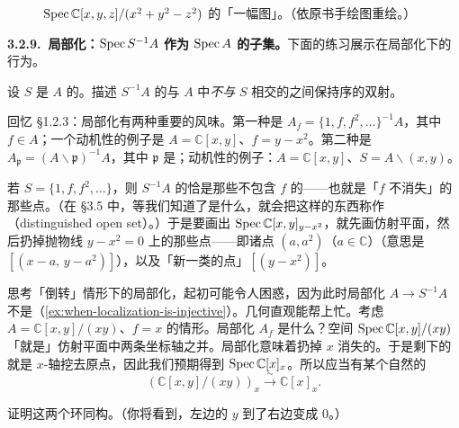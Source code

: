 \begin{figure}[htbp]
\centering
{}
\caption{$\operatorname{Spec}\mathbb{C}[x,y,z]/(x^2+y^2-z^2)$ 的「一幅图」。（依原书手绘图重绘。）}\label{fig:cone-picture}
\end{figure}

\textbf{3.2.9.\ 局部化：$\operatorname{Spec} S^{-1}A$ 作为 $\operatorname{Spec} A$ 的子集。}\quad 下面的练习展示\trPrimeIdeal{}在局部化下的行为。

\begin{exercise}\label{ex:localization-primes-bijection}
设 $S$ 是 $A$ 的\trMultiplicativeSubset。描述 $S^{-1}A$ 的\trPrimeIdeal{}与 $A$ 中\emph{不与}\trMultiplicativeSubset{} $S$ 相交的\trPrimeIdeal{}之间保持序的双射。
\end{exercise}

回忆 \S1.2.3：局部化有两种重要的风味。第一种是 $A_f=\{1,f,f^2,\dots\}^{-1}A$，其中 $f\in A$；一个动机性的例子是 $A=\mathbb{C}[x,y]$、$f=y-x^2$。第二种是 $A_{\mathfrak{p}}=(A\smallsetminus\mathfrak{p})^{-1}A$，其中 $\mathfrak{p}$ 是\trPrimeIdeal；动机性的例子：$A=\mathbb{C}[x,y]$、$S=A\smallsetminus(x,y)$。

若 $S=\{1,f,f^2,\dots\}$，则 $S^{-1}A$ 的\trPrimeIdeal{}恰是那些不包含 $f$ 的\trPrimeIdeal——也就是「$f$ 不消失」的那些点。（在 \S3.5 中，等我们知道了\trOpenSet{}是什么，就会把这样的东西称作\emph{\trDistinguishedOpen}（distinguished open set）。）于是要画出 $\operatorname{Spec}\mathbb{C}[x,y]_{y-x^2}$，就先画仿射平面，然后扔掉抛物线 $y-x^2=0$ 上的那些点——即诸点 $(a,a^2)$（$a\in\mathbb{C}$）（意思是 $[(x-a,\,y-a^2)]$），以及「新一类的点」$[(y-x^2)]$。

思考「倒转\trZerodivisor」情形下的局部化，起初可能令人困惑，因为此时局部化 $A\to S^{-1}A$ 不是\trInjectiveMap（\cref{ex:when-localization-is-injective}）。几何直观能帮上忙。考虑 $A=\mathbb{C}[x,y]/(xy)$、$f=x$ 的情形。局部化 $A_f$ 是什么？空间 $\operatorname{Spec}\mathbb{C}[x,y]/(xy)$「就是」仿射平面中两条坐标轴之并。局部化意味着扔掉 $x$ 消失的\trLocus。于是剩下的就是 $x$-轴挖去原点，因此我们预期得到 $\operatorname{Spec}\mathbb{C}[x]_x$。所以应当有某个自然的\trIsomorphism
\[
(\mathbb{C}[x,y]/(xy))_x\stackrel{\ \sim\ }{\longrightarrow}\mathbb{C}[x]_x.
\]

\begin{exercise}\label{ex:xy-localization-isomorphism}
证明这两个环同构。（你将看到，左边的 $y$ 到了右边变成 $0$。）
\end{exercise}

